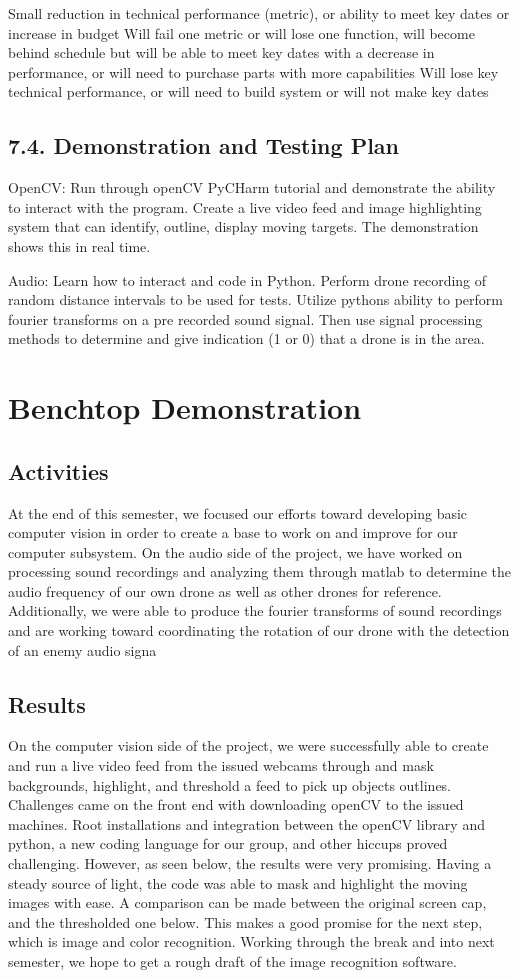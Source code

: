 \documentclass[10pt]{article}
\begin{document}
Small reduction in technical performance (metric), or ability to meet key dates or increase in budget
Will fail one metric or will lose one function, will become behind schedule but will be able to meet key dates with a decrease in performance, or will need to purchase parts with more capabilities
Will lose key technical performance, or will need to build system or will not make key dates

\subsection{7.4. Demonstration and Testing Plan}
OpenCV: Run through openCV PyCHarm tutorial and demonstrate the ability to interact with the program. Create a live video feed and image highlighting system that can identify, outline, display moving targets. The demonstration shows this in real time.  

Audio: Learn how to interact and code in Python. Perform drone recording of random distance intervals to be used for tests. Utilize pythons ability to perform fourier transforms on a pre recorded sound signal. Then use signal processing methods to determine and give indication (1 or 0) that a drone is in the area.

\section{Benchtop Demonstration}
\subsection{Activities}
At the end of this semester, we focused our efforts toward developing basic computer vision in order to create a base to work on and improve for our computer subsystem.  On the audio side of the project, we have worked on processing sound recordings and analyzing them through matlab to determine the audio frequency of our own drone as well as other drones for reference.  Additionally, we were able to produce the fourier transforms of sound recordings and are working toward coordinating the rotation of our drone with the detection of an enemy audio signa

\subsection{Results}
On the computer vision side of the project, we were successfully able to create and run a live video feed from the issued webcams through and mask backgrounds, highlight, and threshold a feed to pick up objects outlines. Challenges came on the front end with downloading openCV to the issued machines. Root installations and integration between the openCV library and python, a new coding language for our group, and other hiccups proved challenging. However, as seen below, the results were very promising. Having a steady source of light, the code was able to mask and highlight the moving images with ease. A comparison can be made between the original screen cap, and the thresholded one below.  This makes a good promise for the next step, which is image and color recognition. Working through the break and into next semester, we hope to get a rough draft of the image recognition software. 
\end{document}
